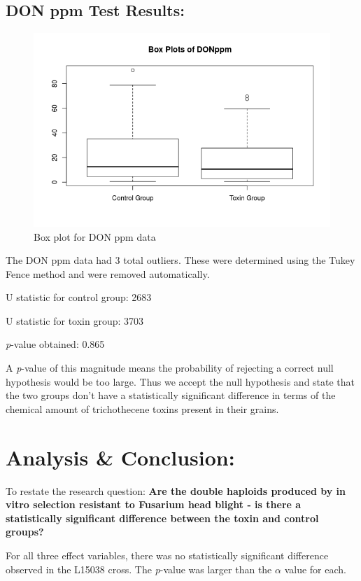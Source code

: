 \documentclass[11pt]{article}
\begin{document}
\subsection{DON ppm Test Results:}
\label{sec:org8c0ba37}
\begin{figure}[h]
\centering
\includegraphics[width=\textwidth]{DONppm}
\caption{Box plot for DON ppm data}
\end{figure}

The DON ppm data had 3 total outliers. These were determined using the Tukey Fence method and were removed automatically.

\noindent
U statistic for control group: 2683

\noindent
U statistic for toxin group: 3703

\noindent
\textit{p}-value obtained: 0.865

A \textit{p}-value of this magnitude means the probability of rejecting a correct null hypothesis would be too large. Thus we accept the null hypothesis and state that the two groups don't have a statistically significant difference in terms of the chemical amount of trichothecene toxins present in their grains.
\section{Analysis \& Conclusion:}
\label{sec:org885bafd}
To restate the research question: \textbf{Are the double haploids produced by in vitro selection resistant to Fusarium head blight - is there a statistically significant difference between the toxin and control groups?}

For all three effect variables, there was no statistically significant difference observed in the L15038 cross. The \textit{p}-value was larger than the \(\alpha\) value for each. 
\end{document}

